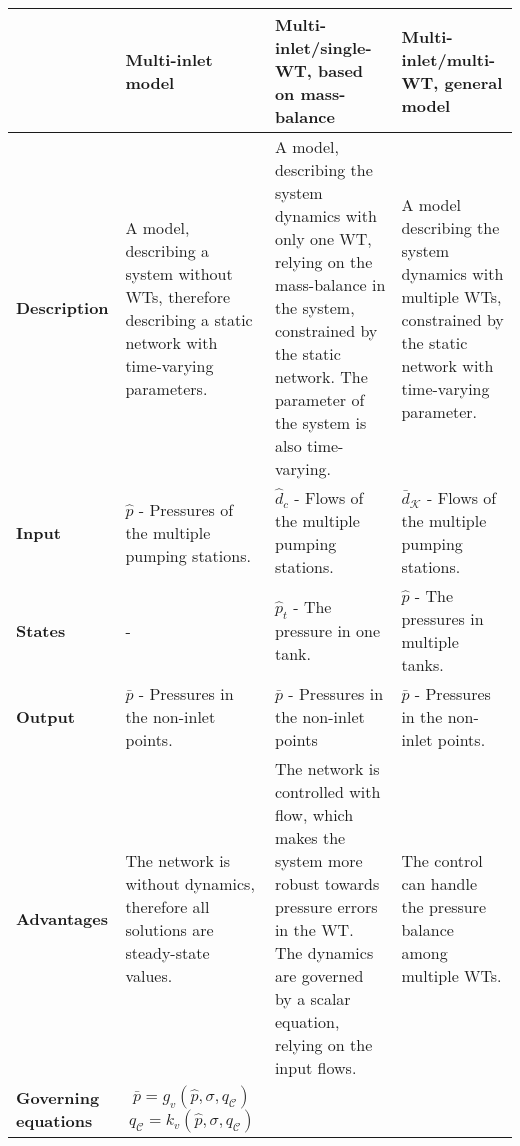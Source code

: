 \begin{center}
    \begin{tabular}{ | >{\centering\arraybackslash}m{1.8cm} | >{\centering\arraybackslash}m{3.6cm} | >{\centering\arraybackslash}m{3.6cm} | >{\centering\arraybackslash}m{3.6cm} |}
    \hline
    \multirow{1}{*}
     & \textbf{Multi-inlet model} & \textbf{Multi-inlet/single-WT, based on mass-balance} & \textbf{Multi-inlet/multi-WT, general model} \\ 
     \hline
     \multirow{1}{*}
    \textbf{Description} & A model, describing a system without WTs, therefore describing a static network with time-varying parameters. & A model, describing the system dynamics with only one WT, relying on the mass-balance in the system, constrained by the static network. The parameter of the system is also time-varying. & A model describing the system dynamics with multiple WTs, constrained by the static network with time-varying parameter.\\ 
    \hline
      \multirow{1}{*}
    \textbf{Input} & $\hat{p}$ - Pressures of the multiple pumping stations. & $\hat{d}_c$ - Flows of the multiple pumping stations. & $\bar{d}_{\mathcal{K}}$ - Flows of the multiple pumping stations.\\ 
    \hline
      \multirow{1}{*}
    \textbf{States} & - & $\hat{p}_t$ - The pressure in one tank. & $\hat{p}$ - The pressures in multiple tanks.\\ 
    \hline
      \multirow{1}{*}
    \textbf{Output} & $\bar{p}$ - Pressures in the non-inlet points. & $\bar{p}$ - Pressures in the non-inlet points & $\bar{p}$ - Pressures in the non-inlet points.\\ 
    \hline
      \multirow{1}{*}
    \textbf{Advantages} & The network is without dynamics, therefore all solutions are steady-state values. & The network is controlled with flow, which makes the system more robust towards pressure errors in the WT. The dynamics are governed by a scalar equation, relying on the input flows.  & The control can handle the pressure balance among multiple WTs.\\ 
    \hline
      \multirow{1}{*}
    \textbf{Governing equations} & 
    \begin{equation*}
\label{final_flowmodel_abstract}
    \bar{p} = g_{v}( \hat{p}, \sigma, q_\mathcal{C})
\end{equation*}
\vspace{-10mm}
\begin{equation*}
q_\mathcal{C} = k_{v}(\hat{p}, \sigma, q_\mathcal{C})
\end{equation*}  & \begin{equation*}

\end{equation*}
\end{tabular}
\end{center}
